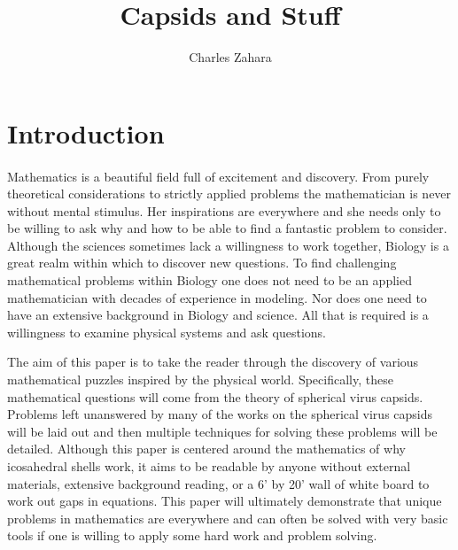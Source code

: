 \documentclass[12pt,letter]{article}
\begin{document}

\title{Capsids and Stuff}
\author{Charles Zahara}
\maketitle

\newpage

\tableofcontents
\newpage
\listoffigures

\newpage

\section{Introduction}


\paragraph{}
Mathematics is a beautiful field full of excitement and discovery. From purely theoretical considerations to strictly applied problems the mathematician is never without mental stimulus. Her inspirations are everywhere and she needs only to be willing to ask why and how to be able to find a fantastic problem to consider. Although the sciences sometimes lack a willingness to work together, Biology is a great realm within which to discover new questions. To find challenging mathematical problems within Biology one does not need to be an applied mathematician with decades of experience in modeling. Nor does one need to have an extensive background in Biology and science. All that is required is a willingness to examine physical systems and ask questions.

The aim of this paper is to take the reader through the discovery of various mathematical puzzles inspired by the physical world. Specifically, these mathematical questions will come from the theory of spherical virus capsids. Problems left unanswered by many of the works on the spherical virus capsids will be laid out and then multiple techniques for solving these problems will be detailed. Although this paper is centered around the mathematics of why icosahedral shells work, it aims to be readable by anyone without external materials, extensive background reading, or a 6' by 20' wall of white board to work out gaps in equations. This paper will ultimately demonstrate that unique problems in mathematics are everywhere and can often be solved with very basic tools if one is willing to apply some hard work and problem solving.
\end{document}
